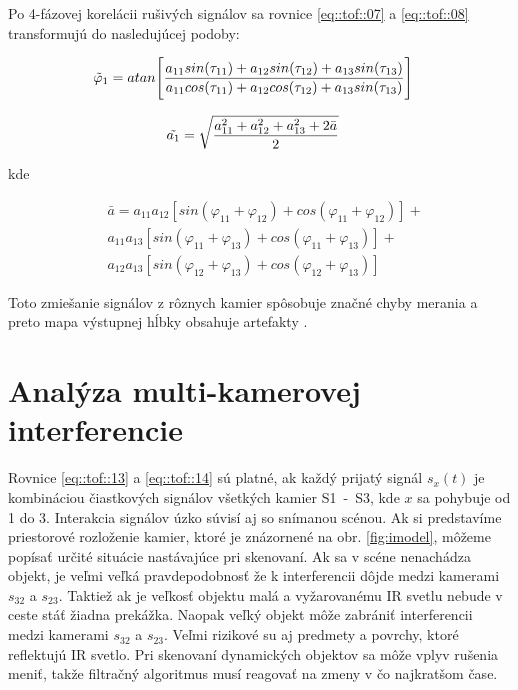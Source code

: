 \noindent  Po 4-fázovej korelácii rušivých signálov sa rovnice \ref{eq::tof::07} a \ref{eq::tof::08} transformujú do nasledujúcej podoby:

\begin{equation}
\label{eq::tof::13}
\begin{aligned}
&{ \Tilde{\varphi}_1}= atan \Bigg[ {\frac{a_{11}  sin( \tau _{11}) + a_{12}  sin( \tau _{12}) + a_{13}  sin( \tau _{13})}{a_{11}  cos( \tau _{11}) + a_{12}  cos( \tau _{12}) + a_{13}  sin( \tau _{13}) }} \Bigg]
\end{aligned}
\end{equation}

\begin{equation}
\label{eq::tof::14}
\begin{aligned}
&\Tilde{ a_1 }= {\sqrt{\frac{a_{11}^2+a_{12}^2+a_{13}^2 + 2\bar{a}}{2} }}
\end{aligned}
\end{equation}

\noindent kde

\begin{equation}
\label{eq::tof::15}
\begin{aligned}
&{\bar{a}} = {a_{11}a_{12}[sin({\varphi_{11}+\varphi_{12}}) + cos({\varphi_{11}+\varphi_{12}})]} + \\  
&{a_{11}a_{13}[sin({\varphi_{11}+\varphi_{13}}) + cos ({\varphi_{11}+\varphi_{13}})]} + \\
&{a_{12}a_{13}[sin({\varphi_{12}+\varphi_{13}}) + cos ({\varphi_{12}+\varphi_{13}})]}
\end{aligned}
\end{equation}

Toto zmiešanie signálov z rôznych kamier spôsobuje značné chyby merania a preto mapa výstupnej hĺbky obsahuje artefakty \cite{Litehua}.

\section{Analýza multi-kamerovej interferencie}

Rovnice \ref{eq::tof::13} a \ref{eq::tof::14} sú platné, ak každý prijatý signál $s_{x}(t)$ je kombináciou čiastkových signálov všetkých kamier S1\, - \,S3, kde $x$ sa pohybuje od 1 do 3.
Interakcia signálov úzko súvisí aj so snímanou scénou. Ak si predstavíme priestorové rozloženie kamier, ktoré je znázornené na obr. \ref{fig:imodel}, môžeme popísať určité situácie nastávajúce pri skenovaní. Ak sa v scéne nenachádza objekt, je veľmi veľká pravdepodobnosť že k interferencii dôjde medzi kamerami $s_{32}$ a $s_{23}$. Taktiež ak je veľkosť objektu malá a vyžarovanému IR svetlu nebude v ceste stáť žiadna prekážka. Naopak veľký objekt môže zabrániť interferencii medzi kamerami $s_{32}$ a $s_{23}$. Veľmi rizikové su aj predmety a povrchy, ktoré reflektujú IR svetlo. Pri skenovaní dynamických objektov sa môže vplyv rušenia meniť, takže filtračný algoritmus musí reagovať na zmeny v čo najkratšom čase.

